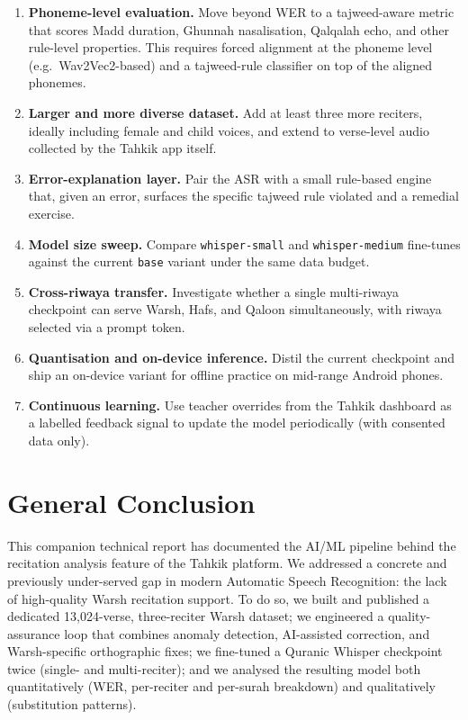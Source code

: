\documentclass[12pt,a4paper]{report}
\begin{document}
\begin{goldbox}[title=Future work]
\begin{enumerate}
  \item \textbf{Phoneme-level evaluation.} Move beyond WER to a
        tajweed-aware metric that scores Madd duration, Ghunnah
        nasalisation, Qalqalah echo, and other rule-level properties.
        This requires forced alignment at the phoneme level (e.g.\
        Wav2Vec2-based) and a tajweed-rule classifier on top of the
        aligned phonemes.
  \item \textbf{Larger and more diverse dataset.} Add at least three
        more reciters, ideally including female and child voices, and
        extend to verse-level audio collected by the Tahkik app itself.
  \item \textbf{Error-explanation layer.} Pair the ASR with a small
        rule-based engine that, given an error, surfaces the specific
        tajweed rule violated and a remedial exercise.
  \item \textbf{Model size sweep.} Compare \texttt{whisper-small} and
        \texttt{whisper-medium} fine-tunes against the current
        \texttt{base} variant under the same data budget.
  \item \textbf{Cross-riwaya transfer.} Investigate whether a single
        multi-riwaya checkpoint can serve Warsh, Hafs, and Qaloon
        simultaneously, with riwaya selected via a prompt token.
  \item \textbf{Quantisation and on-device inference.} Distil the
        current checkpoint and ship an on-device variant for offline
        practice on mid-range Android phones.
  \item \textbf{Continuous learning.} Use teacher overrides from the
        Tahkik dashboard as a labelled feedback signal to update the
        model periodically (with consented data only).
\end{enumerate}
\end{goldbox}

\chapter*{General Conclusion}
\label{ch:mt_conclusion}

This companion technical report has documented the AI/ML pipeline
behind the recitation analysis feature of the Tahkik platform. We
addressed a concrete and previously under-served gap in modern
Automatic Speech Recognition: the lack of high-quality Warsh
recitation support. To do so, we built and published a dedicated
13{,}024-verse, three-reciter Warsh dataset; we engineered a
quality-assurance loop that combines anomaly detection, AI-assisted
correction, and Warsh-specific orthographic fixes; we fine-tuned a
Quranic Whisper checkpoint twice (single- and multi-reciter); and we
analysed the resulting model both quantitatively (WER, per-reciter and
per-surah breakdown) and qualitatively (substitution patterns).
\end{document}
